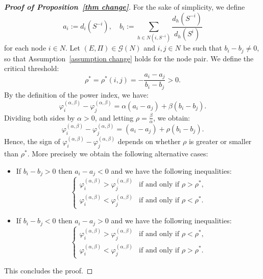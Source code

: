 \documentclass[preprint,11pt,authoryear]{elsarticle}
\newcommand{\dsum}{\displaystyle\sum}
\theoremstyle{plain}
\begin{document}
\begin{proof}[\bf Proof of Proposition~\ref{thm change}]
	For the sake of simplicity, we define 
	$$a_i:= d_i(S^{-i}), \quad b_i:=\dsum_{h \in N(i, S^{-i})} \dfrac{d_h(S^{-i})}{d_h(S^{i})}$$ 
	for each node $i\in N$.
	Let $(E,\Pi)\in\mathcal{G}(N)$ and \( i, j \in N \) be such that \( b_i - b_j \neq 0 \), so that Assumption~\eqref{assumption change} holds for the node pair. We define the critical threshold:
	\[
	\rho^* = \rho^*(i, j) = -\frac{a_i - a_j}{b_i - b_j}>0.
	\]
	By the definition of the power index, we have:
	\[
	\varphi_i^{(\alpha,\beta)} - \varphi_j^{(\alpha,\beta)} = \alpha(a_i - a_j) + \beta(b_i - b_j).
	\]
	Dividing both sides by \( \alpha > 0 \), and letting \( \rho = \frac{\beta}{\alpha} \), we obtain:
	\[
	\varphi_i^{(\alpha,\beta)} - \varphi_j^{(\alpha,\beta)} = (a_i - a_j) + \rho(b_i - b_j).
	\]
	Hence, the sign of \( \varphi_i^{(\alpha,\beta)} - \varphi_j^{(\alpha,\beta)} \) depends on whether \( \rho \) is greater or smaller than \( \rho^* \). More precisely we obtain the following alternative cases:
	\begin{itemize}
		\item[-] If \( b_i - b_j > 0 \) then \(a_i - a_j< 0 \) and we have the following inequalities:
		\[
		\begin{cases}
			\varphi_i^{(\alpha,\beta)} > \varphi_j^{(\alpha,\beta)} & \text{if and only if } \rho > \rho^*, \\
			\varphi_i^{(\alpha,\beta)} < \varphi_j^{(\alpha,\beta)} & \text{if and only if } \rho < \rho^*.
		\end{cases}
		\]
		\item[-] If \( b_i - b_j < 0 \) then \(a_i - a_j > 0 \) and
		we have the following inequalities:
		\[
		\begin{cases}
			\varphi_i^{(\alpha,\beta)} > \varphi_j^{(\alpha,\beta)} & \text{if and only if } \rho < \rho^*, \\
			\varphi_i^{(\alpha,\beta)} < \varphi_j^{(\alpha,\beta)} & \text{if and only if } \rho > \rho^*.
		\end{cases}
		\]
	\end{itemize}
	This concludes the proof.
\end{proof}
\end{document}
